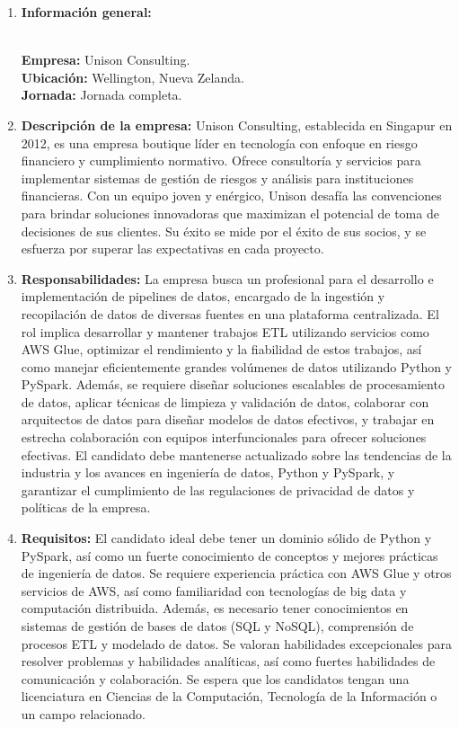\documentclass[12pt]{article}
\begin{document}
                \begin{enumerate}
                    \item \textbf{Información general:}
                    
                        \textbf{\\Empresa:} Unison Consulting.
                        \textbf{\\Ubicación:} Wellington, Nueva Zelanda.
                        \textbf{\\Jornada:} Jornada completa.

                    \item \textbf{Descripción de la empresa:}
                        Unison Consulting, establecida en Singapur en 2012, es una empresa boutique líder en tecnología con enfoque en riesgo financiero y cumplimiento normativo. Ofrece consultoría y servicios para implementar sistemas de gestión de riesgos y análisis para instituciones financieras. Con un equipo joven y enérgico, Unison desafía las convenciones para brindar soluciones innovadoras que maximizan el potencial de toma de decisiones de sus clientes. Su éxito se mide por el éxito de sus socios, y se esfuerza por superar las expectativas en cada proyecto.

                    \item \textbf{Responsabilidades:}
                        La empresa busca un profesional para el desarrollo e implementación de pipelines de datos, encargado de la ingestión y recopilación de datos de diversas fuentes en una plataforma centralizada. El rol implica desarrollar y mantener trabajos ETL utilizando servicios como AWS Glue, optimizar el rendimiento y la fiabilidad de estos trabajos, así como manejar eficientemente grandes volúmenes de datos utilizando Python y PySpark. Además, se requiere diseñar soluciones escalables de procesamiento de datos, aplicar técnicas de limpieza y validación de datos, colaborar con arquitectos de datos para diseñar modelos de datos efectivos, y trabajar en estrecha colaboración con equipos interfuncionales para ofrecer soluciones efectivas. El candidato debe mantenerse actualizado sobre las tendencias de la industria y los avances en ingeniería de datos, Python y PySpark, y garantizar el cumplimiento de las regulaciones de privacidad de datos y políticas de la empresa.

                    \item \textbf{Requisitos:}
                        El candidato ideal debe tener un dominio sólido de Python y PySpark, así como un fuerte conocimiento de conceptos y mejores prácticas de ingeniería de datos. Se requiere experiencia práctica con AWS Glue y otros servicios de AWS, así como familiaridad con tecnologías de big data y computación distribuida. Además, es necesario tener conocimientos en sistemas de gestión de bases de datos (SQL y NoSQL), comprensión de procesos ETL y modelado de datos. Se valoran habilidades excepcionales para resolver problemas y habilidades analíticas, así como fuertes habilidades de comunicación y colaboración. Se espera que los candidatos tengan una licenciatura en Ciencias de la Computación, Tecnología de la Información o un campo relacionado.


\end{enumerate}
\end{document}
